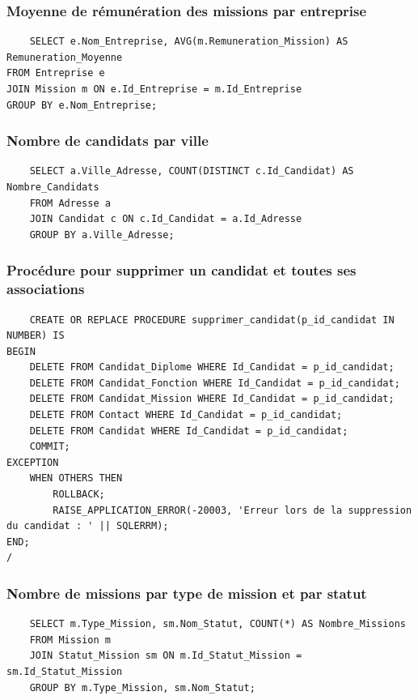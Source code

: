 \documentclass[a4paper,12pt]{article}
\begin{document}
\subsubsection*{Moyenne de rémunération des missions par entreprise}
\begin{verbatim}
    SELECT e.Nom_Entreprise, AVG(m.Remuneration_Mission) AS Remuneration_Moyenne
FROM Entreprise e
JOIN Mission m ON e.Id_Entreprise = m.Id_Entreprise
GROUP BY e.Nom_Entreprise;
\end{verbatim}
\subsubsection*{Nombre de candidats par ville}
\begin{verbatim}
    SELECT a.Ville_Adresse, COUNT(DISTINCT c.Id_Candidat) AS Nombre_Candidats
    FROM Adresse a
    JOIN Candidat c ON c.Id_Candidat = a.Id_Adresse
    GROUP BY a.Ville_Adresse;
\end{verbatim}
\subsubsection*{Procédure pour supprimer un candidat et toutes ses associations}
\begin{verbatim}
    CREATE OR REPLACE PROCEDURE supprimer_candidat(p_id_candidat IN NUMBER) IS
BEGIN
    DELETE FROM Candidat_Diplome WHERE Id_Candidat = p_id_candidat;
    DELETE FROM Candidat_Fonction WHERE Id_Candidat = p_id_candidat;
    DELETE FROM Candidat_Mission WHERE Id_Candidat = p_id_candidat;
    DELETE FROM Contact WHERE Id_Candidat = p_id_candidat;
    DELETE FROM Candidat WHERE Id_Candidat = p_id_candidat;
    COMMIT;
EXCEPTION
    WHEN OTHERS THEN
        ROLLBACK;
        RAISE_APPLICATION_ERROR(-20003, 'Erreur lors de la suppression du candidat : ' || SQLERRM);
END;
/

\end{verbatim}
\subsubsection*{Nombre de missions par type de mission et par statut}
\begin{verbatim}
    SELECT m.Type_Mission, sm.Nom_Statut, COUNT(*) AS Nombre_Missions
    FROM Mission m
    JOIN Statut_Mission sm ON m.Id_Statut_Mission = sm.Id_Statut_Mission
    GROUP BY m.Type_Mission, sm.Nom_Statut;
\end{verbatim}
\end{document}
